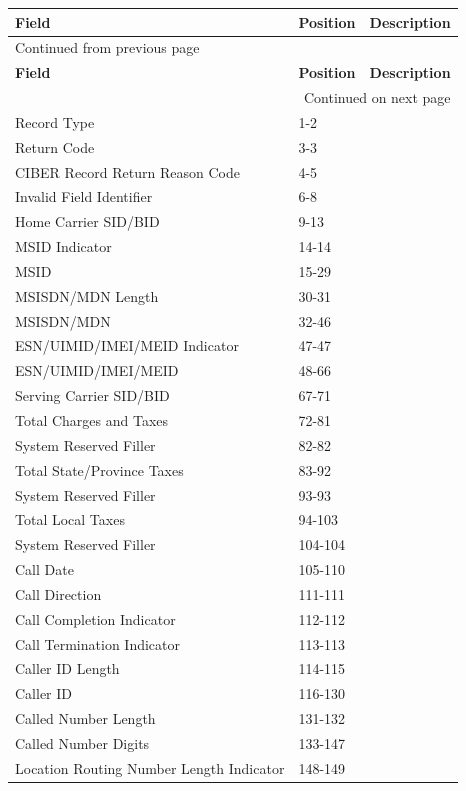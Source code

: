 \documentclass[12pt,twoside]{article}
\begin{document}
\begin{longtable}{l|l|l}
\hline
\textbf{Field} & \textbf{Position} & \textbf{Description}\\
\hline
\endfirsthead
\multicolumn{3}{l}{Continued from previous page} \\
\hline

\textbf{Field} & \textbf{Position} & \textbf{Description} \\

\hline
\endhead
\hline\multicolumn{3}{r}{Continued on next page} \\
\endfoot
\endlastfoot
\hline
Record Type & 1-2 & \\
Return Code & 3-3 & \\
CIBER Record Return Reason Code & 4-5 & \\
Invalid Field Identifier & 6-8 & \\
Home Carrier SID/BID & 9-13 & \\
MSID Indicator & 14-14 & \\
MSID & 15-29 & \\
MSISDN/MDN Length & 30-31 & \\
MSISDN/MDN & 32-46 & \\
ESN/UIMID/IMEI/MEID Indicator & 47-47 & \\
ESN/UIMID/IMEI/MEID & 48-66 & \\
Serving Carrier SID/BID & 67-71 & \\
Total Charges and Taxes & 72-81 & \\
System Reserved Filler & 82-82 & \\
Total State/Province Taxes & 83-92 & \\
System Reserved Filler & 93-93 & \\
Total Local Taxes & 94-103 & \\
System Reserved Filler & 104-104 & \\
Call Date & 105-110 & \\
Call Direction & 111-111 & \\
Call Completion Indicator & 112-112 & \\
Call Termination Indicator & 113-113 & \\
Caller ID Length & 114-115 & \\
Caller ID & 116-130 & \\
Called Number Length & 131-132 & \\
Called Number Digits & 133-147 & \\
Location Routing Number Length Indicator & 148-149 & \\

\end{longtable}
\end{document}
